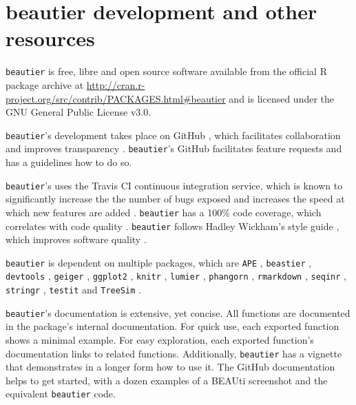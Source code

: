\documentclass{article}
\begin{document}
\section{beautier development and other resources}

\verb;beautier; is free, libre and open source software available from the official R package archive at 
\url{http://cran.r-project.org/src/contrib/PACKAGES.html\#beautier}
and is licensed under the GNU General Public License v3.0.

\verb;beautier;'s development takes place on GitHub \cite{github}, 
which facilitates collaboration \cite{perez2016ten} 
and improves transparency \cite{gorgolewski2016practical}.
\verb;beautier;'s GitHub facilitates feature requests and has a guidelines how to do so.

\verb;beautier;'s uses the Travis CI \cite{travis} 
continuous integration service, which is known to significantly 
increase the the number of bugs exposed \cite{vasilescu2015} and increases
the speed at which new features are added \cite{vasilescu2015}.
\verb;beautier; has a 100\% code coverage, which correlates with code quality \cite{horgan1994,del1995correlation}. 
\verb;beautier; follows Hadley Wickham's style guide \cite{style_guide}, which improves software quality \cite{fang2001}.

\verb;beautier; is dependent on multiple packages, which are 
\verb;APE; \cite{APE}, 
\verb;beastier; \cite{beastier},
\verb;devtools; \cite{devtools},
\verb;geiger; \cite{GEIGER},
\verb;ggplot2; \cite{ggplot2},
\verb;knitr; \cite{knitr},
\verb;lumier; \cite{lumier},
\verb;phangorn; \cite{phangorn},
\verb;rmarkdown; \cite{rmarkdown},
\verb;seqinr; \cite{seqinr},
\verb;stringr; \cite{stringr},
\verb;testit; \cite{testit} and 
\verb;TreeSim; \cite{TreeSim}.

\verb;beautier;'s documentation is extensive, yet concise. All functions are documented
in the package's internal documentation. For quick use, each exported function shows a minimal example. 
For easy exploration, each exported function's documentation links to related functions.
Additionally, \verb;beautier; has a vignette that demonstrates in a longer form how
to use it. The GitHub documentation helps to get started, with a dozen examples 
of a BEAUti screenshot and the equivalent \verb;beautier; code.

\end{document}
